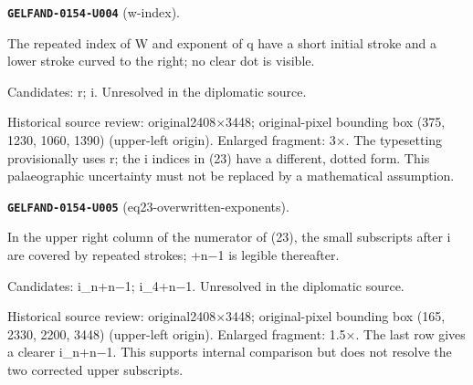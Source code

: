 \par\noindent\leavevmode{}\label{GELFAND-0154-U004}\textbf{\texttt{GELFAND-0154-U004}} (w-index).\nopagebreak[4]\par
The repeated index of W and exponent of q have a short initial stroke and a lower stroke curved to the right; no clear dot is visible.\par
Candidates: r; i. Unresolved in the diplomatic source.\par
Historical source review: original2408×3448; original-pixel bounding box (375, 1230, 1060, 1390) (upper-left origin). Enlarged fragment: 3×. The typesetting provisionally uses r; the i indices in (23) have a different, dotted form. This palaeographic uncertainty must not be replaced by a mathematical assumption.\par\medskip
\par\noindent\leavevmode{}\label{GELFAND-0154-U005}\textbf{\texttt{GELFAND-0154-U005}} (eq23-overwritten-exponents).\nopagebreak[4]\par
In the upper right column of the numerator of (23), the small subscripts after i are covered by repeated strokes; +n−1 is legible thereafter.\par
Candidates: i\_n+n−1; i\_4+n−1. Unresolved in the diplomatic source.\par
Historical source review: original2408×3448; original-pixel bounding box (165, 2330, 2200, 3448) (upper-left origin). Enlarged fragment: 1.5×. The last row gives a clearer i\_n+n−1. This supports internal comparison but does not resolve the two corrected upper subscripts.\par\medskip
